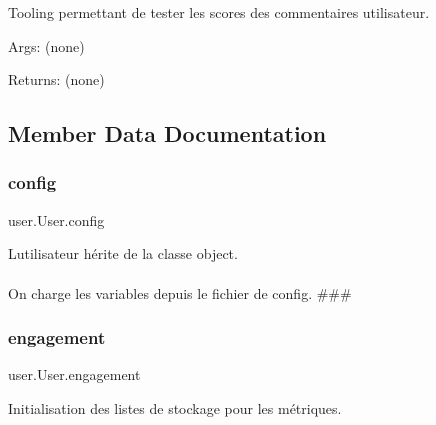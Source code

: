 \begin{DoxyVerb}Tooling permettant de tester les scores des commentaires utilisateur.

Args:
    (none)

Returns:
    (none)
\end{DoxyVerb}
 

\subsection{Member Data Documentation}
\mbox{\label{classuser_1_1_user_a40419b31c47368b454fa2003b5df9307}} 
\subsubsection{\texorpdfstring{config}{config}}
{\footnotesize\ttfamily user.\+User.\+config}



L\textquotesingle{}utilisateur hérite de la classe {\ttfamily object}. 

\paragraph*{}

On charge les variables depuis le fichier de config. \#\#\# \mbox{\label{classuser_1_1_user_a7e0889f882283a613c48be7c1c5802cb}} 
\subsubsection{\texorpdfstring{engagement}{engagement}}
{\footnotesize\ttfamily user.\+User.\+engagement}



Initialisation des listes de stockage pour les métriques. 

\paragraph*{}

